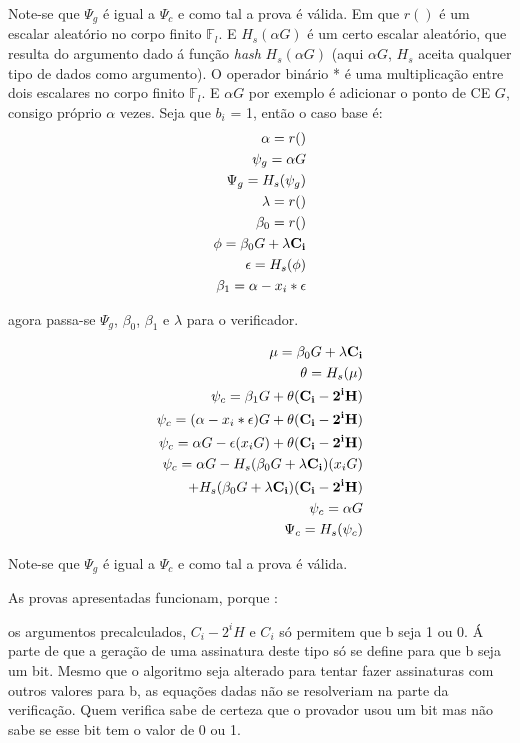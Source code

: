 Note-se que $\Psi_g$ é igual a $\Psi_c$ e como tal a prova é válida.\newline
Em que $r()$ é um escalar aleatório no corpo finito $\mathbb{F}_l$. E $H_s(\alpha G)$ é um certo escalar aleatório, que resulta do argumento dado á função {\em hash} $H_s(\alpha G)$ (aqui $\alpha G$, $H_s$ aceita qualquer tipo de dados como argumento).   
O operador binário * é uma multiplicação entre dois escalares no corpo finito $\mathbb{F}_l$. E $\alpha G$ por exemplo é adicionar o ponto de CE $G$, consigo próprio $\alpha$ vezes.  
\newpage
Seja que $b_i$ = 1, então o caso base é:
\begin{align*}
\alpha=r()\\
\psi_g = \alpha G\\
\Psi_g = H_s(\psi_g)\\
\lambda = r()\\
\beta_0=r()\\
\phi=\beta_0 G + \lambda \bold{C_i}\\
\epsilon = H_s(\phi)\\
\beta_1 = \alpha-x_i*\epsilon\\
\end{align*}

agora passa-se $\Psi_g$, $\beta_0$, $\beta_1$ e $\lambda$ para o verificador.  

\begin{align*}
\mu=\beta_0 G + \lambda \bold{C_i}\\
\theta= H_s(\mu)\\
\psi_c = \beta_1 G + \theta (\bold{C_i - 2^i H})\\
\psi_c = (\alpha-x_i*\epsilon) G + \theta (\bold{C_i - 2^i H})\\
\psi_c = \alpha G - \epsilon(x_i G)
                  + \theta (\bold{C_i - 2^i H})\\
\psi_c = \alpha G - H_s(\beta_0 G + \lambda \bold{C_i})(x_i G)\\
                 + H_s(\beta_0 G + \lambda \bold{C_i})(\bold{C_i - 2^i H})\\
\psi_c = \alpha G\\ 
\Psi_c = H_s(\psi_c)\\
\end{align*}

Note-se que $\Psi_g$ é igual a $\Psi_c$ e como tal a prova é válida.

As provas apresentadas funcionam, porque :

os argumentos precalculados, $C_i - 2^i H$ e $C_i$ só permitem que b seja 1 ou 0.
Á parte de que a geração de uma assinatura deste tipo só se define para que b seja um bit. Mesmo que o algoritmo seja alterado para tentar fazer assinaturas com outros valores para b, as equações dadas não se resolveriam na parte da verificação.
Quem verifica sabe de certeza que o provador usou um bit mas não sabe se esse bit tem o valor de 0 ou 1.

